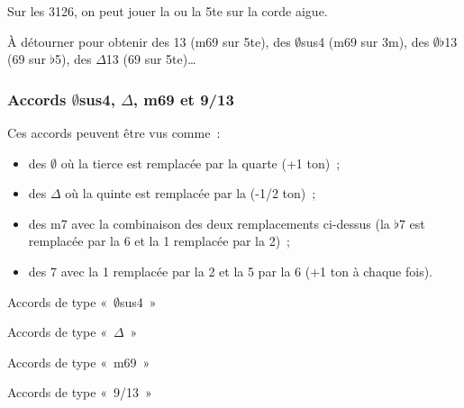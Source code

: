 \documentclass[11pt]{article}
\begin{document}
Sur les 3126, on peut jouer la  ou la 5te sur la corde aigue.

À détourner pour obtenir des 13 (m69 sur 5te), des $\emptyset$sus4 (m69 sur
3m), des $\emptyset\flat$13 (69 sur $\flat$5), des $\Delta$13 (69 sur
5te)…

\subsubsection{Accords $\emptyset$sus4, $\Delta$, m69 et 9/13}

Ces accords peuvent être vus comme :

\begin{itemize}
    \item des $\emptyset$ où la tierce est remplacée par la quarte (+1 ton) ;
    \item des $\Delta$ où la quinte est remplacée par la  (-1/2 ton) ;
    \item des m7 avec la combinaison des deux remplacements ci-dessus (la
        $\flat$7 est remplacée par la 6 et la 1 remplacée par la 2) ;
    \item des 7 avec la 1 remplacée par la 2 et la 5 par la 6 (+1 ton à chaque
        fois).
\end{itemize}

Accords de type «~$\emptyset$sus4~»



Accords de type «~$\Delta$~»



Accords de type «~m69~»



Accords de type «~9/13~»
\end{document}
